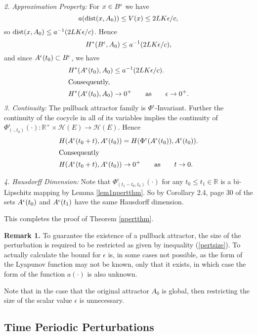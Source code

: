 \begin{prf}
{\em 2. Approximation Property:} For $x \in B^{\epsilon}$ we have
\[ a({\rm dist}(x,A_0))  \leq V(x) \leq 2LK \epsilon / c, \]
so ${\rm dist}(x,A_0) \leq a^{-1}(2LK \epsilon /c)$. Hence
\[ H^*(B^{\epsilon}, A_0) \leq a^{-1}(2LK \epsilon /c), \]
and since $A^{\epsilon}(t_0) \subset B^{\epsilon}$, we have
\begin{align*}
  H^*(A^{\epsilon}(t_0),A_0) &\leq a^{-1}(2LK \epsilon /c). \\
\intertext{Consequently,}
  H^*(A^{\epsilon}(t_0),A_0) &\rightarrow 0^+ \qquad \text{as} \qquad
             \epsilon \rightarrow 0^+. \\
\end{align*}
{\em 3. Continuity:} The pullback attractor family is
$\Phi^{\epsilon}$-Invariant. Further the continuity of the
cocycle in all of its variables implies the continuity of
$\Phi^{\epsilon}_{(\cdot,t_0)}(\cdot): \mathbb{R}^+ \times
\mathcal{H}(E) \to \mathcal{H}(E)$. Hence
\begin{align*}
  H(A^{\epsilon}(t_0 + t),A^{\epsilon}(t_0)) &= H(\Phi^{\epsilon}
       (A^{\epsilon}(t_0)), A^{\epsilon}(t_0)). \\
  \intertext{Consequently}
  H(A^{\epsilon}(t_0 + t),A^{\epsilon}(t_0))  & \rightarrow 0^+ \qquad \text{as}
\qquad t \rightarrow 0. \\
\end{align*}

{\em 4. Hausdorff Dimension:} Note that
  $\Phi^{\epsilon}_{(t_1-t_0,t_0)}(\cdot)$ for any $t_0 \leq t_1 \in
  \mathbb{R}$ is a bi-Lipschitz mapping by Lemma \ref{lem1npertthm}. So by
  Corollary   2.4, page 30 of \cite{Fa90} the sets $A^{\epsilon}(t_0)$ and
  $A^{\epsilon}(t_1)$ have the same Hausdorff dimension.

This completes the proof of Theorem \ref{npertthm}.
\end{prf}

{\bf Remark 1.} To guarantee the existence of a pullback attractor, the
size of the perturbation is required to be restricted as given by inequality
(\ref{pertsize}). To actually calculate the bound for $\epsilon$ is, in some
cases not possible, as the form of the Lyapunov function may not be known,
only that it exists, in which case the form of the function $a(\cdot)$ is
also unknown.

Note that in the case that the original attractor $A_0$ is global, then
restricting the size of the scalar value $\epsilon$ is unnecessary.

\subsection{Time Periodic Perturbations}

